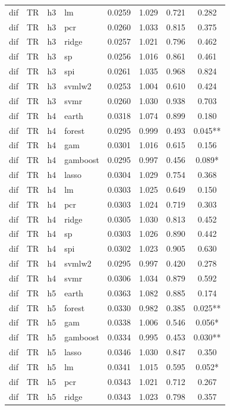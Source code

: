 \begin{ThreePartTable}
\begin{longtable}[t]{llclcccc}
dif & TR & h3 & lm & 0.0259 & 1.029 & 0.721 & 0.282\\
dif & TR & h3 & pcr & 0.0260 & 1.033 & 0.815 & 0.375\\
dif & TR & h3 & ridge & 0.0257 & 1.021 & 0.796 & 0.462\\
dif & TR & h3 & sp & 0.0256 & 1.016 & 0.861 & 0.461\\
dif & TR & h3 & spi & 0.0261 & 1.035 & 0.968 & 0.824\\
dif & TR & h3 & svmlw2 & 0.0253 & 1.004 & 0.610 & 0.424\\
dif & TR & h3 & svmr & 0.0260 & 1.030 & 0.938 & 0.703\\
\addlinespace
dif & TR & h4 & earth & 0.0318 & 1.074 & 0.899 & 0.180\\
dif & TR & h4 & forest & 0.0295 & 0.999 & 0.493 & 0.045**\\
dif & TR & h4 & gam & 0.0301 & 1.016 & 0.615 & 0.156\\
dif & TR & h4 & gamboost & 0.0295 & 0.997 & 0.456 & 0.089*\\
dif & TR & h4 & lasso & 0.0304 & 1.029 & 0.754 & 0.368\\
dif & TR & h4 & lm & 0.0303 & 1.025 & 0.649 & 0.150\\
dif & TR & h4 & pcr & 0.0303 & 1.024 & 0.719 & 0.303\\
dif & TR & h4 & ridge & 0.0305 & 1.030 & 0.813 & 0.452\\
dif & TR & h4 & sp & 0.0303 & 1.026 & 0.890 & 0.442\\
dif & TR & h4 & spi & 0.0302 & 1.023 & 0.905 & 0.630\\
dif & TR & h4 & svmlw2 & 0.0295 & 0.997 & 0.420 & 0.278\\
dif & TR & h4 & svmr & 0.0306 & 1.034 & 0.879 & 0.592\\
\addlinespace
dif & TR & h5 & earth & 0.0363 & 1.082 & 0.885 & 0.174\\
dif & TR & h5 & forest & 0.0330 & 0.982 & 0.385 & 0.025**\\
dif & TR & h5 & gam & 0.0338 & 1.006 & 0.546 & 0.056*\\
dif & TR & h5 & gamboost & 0.0334 & 0.995 & 0.453 & 0.030**\\
dif & TR & h5 & lasso & 0.0346 & 1.030 & 0.847 & 0.350\\
dif & TR & h5 & lm & 0.0341 & 1.015 & 0.595 & 0.052*\\
dif & TR & h5 & pcr & 0.0343 & 1.021 & 0.712 & 0.267\\
dif & TR & h5 & ridge & 0.0343 & 1.023 & 0.798 & 0.357\\

\end{longtable}
\end{ThreePartTable}
